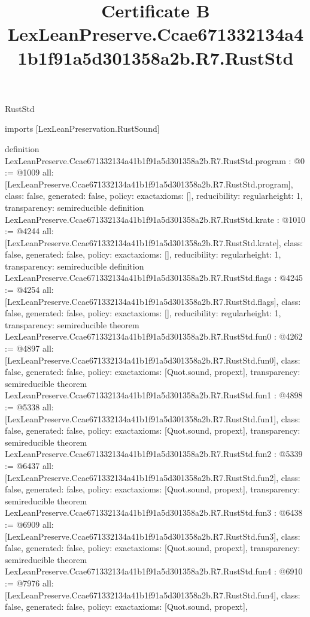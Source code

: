 \begin{lexlean}{RustStd}
\title{Certificate B LexLeanPreserve.Ccae671332134a41b1f91a5d301358a2b.R7.RustStd}
\begin{coremodule}
imports [LexLeanPreservation.RustSound]

definition LexLeanPreserve.Ccae671332134a41b1f91a5d301358a2b.R7.RustStd.program : @0 := @1009 {
  all: [LexLeanPreserve.Ccae671332134a41b1f91a5d301358a2b.R7.RustStd.program],
  class: false,
  generated: false,
  policy: exact{axioms: []},
  reducibility: regular{height: 1},
  transparency: semireducible
}
definition LexLeanPreserve.Ccae671332134a41b1f91a5d301358a2b.R7.RustStd.krate : @1010 := @4244 {
  all: [LexLeanPreserve.Ccae671332134a41b1f91a5d301358a2b.R7.RustStd.krate],
  class: false,
  generated: false,
  policy: exact{axioms: []},
  reducibility: regular{height: 1},
  transparency: semireducible
}
definition LexLeanPreserve.Ccae671332134a41b1f91a5d301358a2b.R7.RustStd.flags : @4245 := @4254 {
  all: [LexLeanPreserve.Ccae671332134a41b1f91a5d301358a2b.R7.RustStd.flags],
  class: false,
  generated: false,
  policy: exact{axioms: []},
  reducibility: regular{height: 1},
  transparency: semireducible
}
theorem LexLeanPreserve.Ccae671332134a41b1f91a5d301358a2b.R7.RustStd.fun0 : @4262 := @4897 {
  all: [LexLeanPreserve.Ccae671332134a41b1f91a5d301358a2b.R7.RustStd.fun0],
  class: false,
  generated: false,
  policy: exact{axioms: [Quot.sound, propext]},
  transparency: semireducible
}
theorem LexLeanPreserve.Ccae671332134a41b1f91a5d301358a2b.R7.RustStd.fun1 : @4898 := @5338 {
  all: [LexLeanPreserve.Ccae671332134a41b1f91a5d301358a2b.R7.RustStd.fun1],
  class: false,
  generated: false,
  policy: exact{axioms: [Quot.sound, propext]},
  transparency: semireducible
}
theorem LexLeanPreserve.Ccae671332134a41b1f91a5d301358a2b.R7.RustStd.fun2 : @5339 := @6437 {
  all: [LexLeanPreserve.Ccae671332134a41b1f91a5d301358a2b.R7.RustStd.fun2],
  class: false,
  generated: false,
  policy: exact{axioms: [Quot.sound, propext]},
  transparency: semireducible
}
theorem LexLeanPreserve.Ccae671332134a41b1f91a5d301358a2b.R7.RustStd.fun3 : @6438 := @6909 {
  all: [LexLeanPreserve.Ccae671332134a41b1f91a5d301358a2b.R7.RustStd.fun3],
  class: false,
  generated: false,
  policy: exact{axioms: [Quot.sound, propext]},
  transparency: semireducible
}
theorem LexLeanPreserve.Ccae671332134a41b1f91a5d301358a2b.R7.RustStd.fun4 : @6910 := @7976 {
  all: [LexLeanPreserve.Ccae671332134a41b1f91a5d301358a2b.R7.RustStd.fun4],
  class: false,
  generated: false,
  policy: exact{axioms: [Quot.sound, propext]},
}
\end{coremodule}
\end{lexlean}
